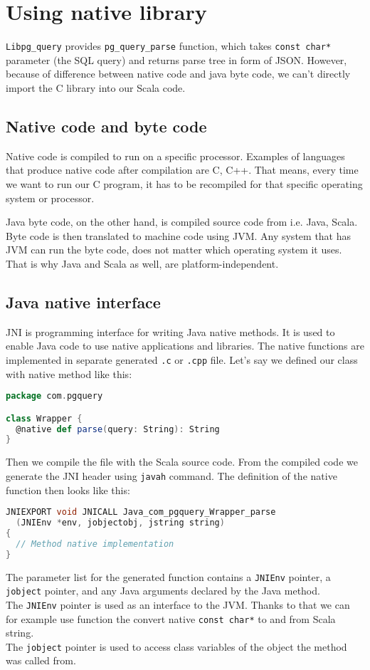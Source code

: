 \section{Using native library}
\texttt{Libpg\_query} provides \texttt{pg\_query\_parse} function, which takes \texttt{const char*} parameter (the SQL query) and returns parse tree in form of JSON. However, because of difference between native code and java byte code, we can't directly import the C library into our Scala code.

\subsection{Native code and byte code}
Native code is compiled to run on a specific processor. Examples of languages that produce native code after compilation are C, C++. That means, every time we want to run our C program, it has to be recompiled for that specific operating system or processor.

Java byte code, on the other hand, is compiled source code from i.e. Java, Scala. Byte code is then translated to machine code using JVM. Any system that has JVM can run the byte code, does not matter which operating system it uses. That is why Java and Scala as well, are platform-independent.

\subsection{Java native interface}
JNI is programming interface for writing Java native methods.\cite{JNI} It is used to enable Java code to use native applications and libraries. The native functions are implemented in separate generated \texttt{.c} or \texttt{.cpp} file. Let's say we defined our class with native method like this:

\begin{lstlisting}[language=scala, basicstyle=\ttfamily, showstringspaces=false]
package com.pgquery

class Wrapper {
  @native def parse(query: String): String
}
\end{lstlisting}

Then we compile the file with the Scala source code. From the compiled code we generate the JNI header using \texttt{javah} command. The definition of the native function then looks like this: 

\begin{lstlisting}[language=c, basicstyle=\ttfamily, showstringspaces=false]
JNIEXPORT void JNICALL Java_com_pgquery_Wrapper_parse
  (JNIEnv *env, jobjectobj, jstring string)
{
  // Method native implementation
}
\end{lstlisting}
The parameter list for the generated function contains a \texttt{JNIEnv} pointer, a \texttt{jobject} pointer, and any Java arguments declared by the Java method.\cite{What is JNI} \\
The \texttt{JNIEnv} pointer is used as an interface to the JVM. Thanks to that we can for example use function the convert native \texttt{const char*} to and from Scala string. \\
The \texttt{jobject} pointer is used to access class variables of the object the method was called from.


